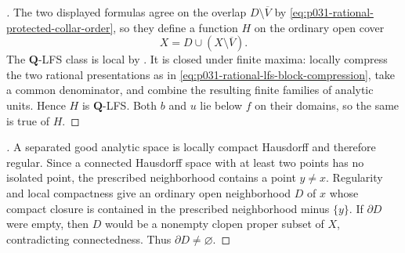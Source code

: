 
\begin{proof}[]
The two displayed formulas agree on the overlap
$D\setminus\overline V$ by
\eqref{eq:p031-rational-protected-collar-order}, so they define a function
$H$ on the ordinary open cover
\[
                         X=D\cup(X\setminus\overline V).
\]
The $\mathbf Q$-LFS class is local by
.  It is closed under finite maxima: locally
compress the two rational presentations as in
\eqref{eq:p031-rational-lfs-block-compression}, take a common denominator,
and combine the resulting finite families of analytic units.  Hence $H$ is
$\mathbf Q$-LFS.  Both $b$ and $u$ lie below $f$ on their domains, so the
same is true of $H$.
\end{proof}

\begin{proof}[]
A separated good analytic space is locally compact Hausdorff and therefore
regular.  Since a connected Hausdorff space with at least two points has no
isolated point, the prescribed neighborhood contains a point $y\ne x$.
Regularity and local compactness give an ordinary open neighborhood $D$ of
$x$ whose compact closure is contained in the prescribed neighborhood
minus $\{y\}$.  If $\partial D$ were empty, then $D$ would be a nonempty
clopen proper subset of $X$, contradicting connectedness.  Thus
$\partial D\ne\varnothing$.
\end{proof}

